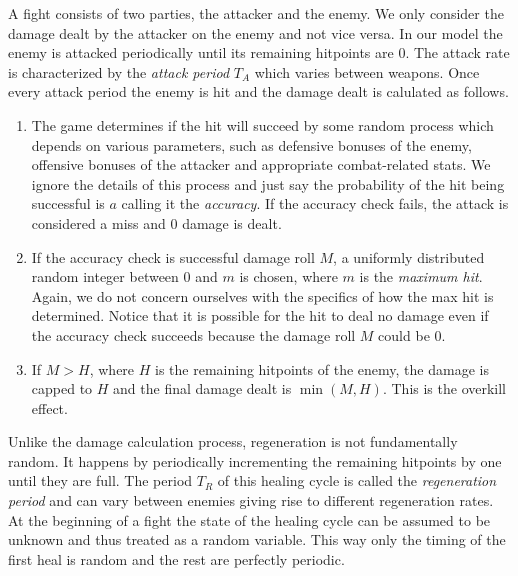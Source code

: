 A fight consists of two parties, the attacker and the enemy. We only consider the damage dealt by the attacker on the enemy and not vice versa. In our model the enemy is attacked periodically until its remaining hitpoints are 0. The attack rate is characterized by the \textit{attack period} $T_A$ which varies between weapons.
Once every attack period the enemy is hit and the damage dealt is calulated as follows.
\begin{enumerate}
	\item The game determines if the hit will succeed by some random process which depends on various parameters, such as defensive bonuses of the enemy, offensive bonuses of the attacker and appropriate combat-related stats. We ignore the details of this process and just say the probability of the hit being successful is $a$ calling it the \textit{accuracy}. If the accuracy check fails, the attack is considered a miss and 0 damage is dealt.
	\item If the accuracy check is successful damage roll $M$, a uniformly distributed random integer between 0 and $m$ is chosen, where $m$ is the \textit{maximum hit}. Again, we do not concern ourselves with the specifics of how the max hit is determined. Notice that it is possible for the hit to deal no damage even if the accuracy check succeeds because the damage roll $M$ could be 0.
    \item If $M > H$, where $H$ is the remaining hitpoints of the enemy, the damage is capped to $H$ and the final damage dealt is $\min(M,H)$. This is the overkill effect.
\end{enumerate}

Unlike the damage calculation process, regeneration is not fundamentally random. It happens by periodically incrementing the remaining hitpoints by one until they are full. The period $T_R$ of this healing cycle is called the \emph{regeneration period} and can vary between enemies giving rise to different regeneration rates. At the beginning of a fight the state of the healing cycle can be assumed to be unknown and thus treated as a random variable. This way only the timing of the first heal is random and the rest are perfectly periodic.
